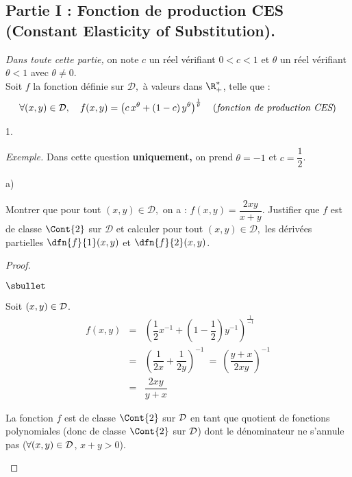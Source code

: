 \subsection*{Partie I : Fonction de production CES (Constant Elasticity 
of Substitution).}

\noindent
{\it Dans toute cette partie,} on note $c$ un réel vérifiant $0<c<1$ et 
$\theta$ un réel vérifiant $\theta < 1$ avec $\theta \neq 0.$\\
Soit $f$ la fonction définie sur $\mathcal{D},$ à valeurs dans 
$\R_+^*$, telle que :
\[
\forall (x,y)\in \mathcal{D},\quad 
f(x,y)=\left(c \, x^\theta+(1-c) \, y^\theta\right)^{\frac{1}{\theta}} 
\quad \text{({\it fonction de production CES})}
\]
\begin{noliste}{1.}
 \setlength{\itemsep}{4mm}
 \item {\it Exemple.} Dans cette question \textbf{uniquement,} on prend 
 $\theta=-1$ et $c=\dfrac{1}{2}$.
 \begin{noliste}{a)}
  \setlength{\itemsep}{2mm}
  \item Montrer que pour tout $(x,y) \in \mathcal{D},$ on a : $f(x,y) = 
  \dfrac{2xy}{x+y}$. Justifier que $f$ est de classe $\Cont{2}$ sur 
  $\mathcal{D}$ et calculer pour tout $(x,y) \in \mathcal{D},$ les 
  dérivées partielles $\dfn{f}{1}(x,y)$ et $\dfn{f}{2}(x,y)$.
  
  \begin{proof}~
   \begin{noliste}{$\sbullet$}
    \item Soit $(x,y) \in {\cal D}$.
    \[
     \begin{array}{rcl}
      f(x,y) &=& \left( \dfrac{1}{2} x^{-1} + \left(1-\dfrac{1}{2}
      \right) y^{-1}\right)^{\frac{1}{-1}}
      \\[.6cm]
      &=& \left( \dfrac{1}{2x} + \dfrac{1}{2y} \right)^{-1}
      \ = \ \left(\dfrac{y+x}{2xy}\right)^{-1}
      \\[.6cm]
      &=& \dfrac{2xy}{y+x}
     \end{array}
    \]
    
    \item La fonction $f$ est de classe $\Cont{2}$ sur ${\cal D}$
    en tant que quotient de fonctions polynomiales (donc de 
    classe $\Cont{2}$ sur ${\cal D}$) dont le dénominateur ne 
    s'annule pas ($\forall (x,y) \in {\cal D}$, $x+y>0$).
    

\end{noliste}
\end{proof}
\end{noliste}
\end{noliste}
